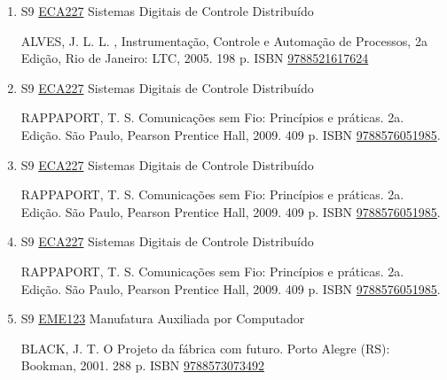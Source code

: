\documentclass[12pt,a4paper]{book}
\begin{document}
\begin{enumerate}
 BEKEY, George A.  Autonomous robots: from biological inspiration to implementation and control.  Massachusetts (EUA): Massachusetts Institute of Technology - MIT, 2005.  577 p.   ISBN \href{http://www.isbnsearch.org/isbn/9780262025782}{9780262025782}
 
 
 \item S9 \hyperref[PUD:ECA227]{ECA227} Sistemas Digitais de Controle Distribuído

  ALVES, J.  L.  L. , Instrumentação, Controle e Automação de Processos, 2a Edição, Rio de Janeiro: LTC, 2005.  198 p.  ISBN \href{http://www.bn.br/site/pages/servicosProfissionais/agenciaISBN/isbnBusca/FbnBuscaISBNCatalogo.asp?pField=ISBN&pIntPagina=1&pISBN=21617624&nidbISBN=true&hidbISBN=true}{9788521617624}
 
 
 \item S9 \hyperref[PUD:ECA227]{ECA227} Sistemas Digitais de Controle Distribuído

  RAPPAPORT, T.  S.  Comunicações sem Fio: Princípios e práticas.  2a.  Edição.  São Paulo, Pearson Prentice Hall, 2009.  409 p.  ISBN \href{http://www.bn.br/site/pages/servicosProfissionais/agenciaISBN/isbnBusca/FbnBuscaISBNCatalogo.asp?pField=ISBN&pIntPagina=1&pISBN=76051985&nidbISBN=true&hidbISBN=true}{9788576051985}.
 \item S9 \hyperref[PUD:ECA227]{ECA227} Sistemas Digitais de Controle Distribuído

  RAPPAPORT, T.  S.  Comunicações sem Fio: Princípios e práticas.  2a.  Edição.  São Paulo, Pearson Prentice Hall, 2009.  409 p.  ISBN \href{http://www.bn.br/site/pages/servicosProfissionais/agenciaISBN/isbnBusca/FbnBuscaISBNCatalogo.asp?pField=ISBN&pIntPagina=1&pISBN=76051985&nidbISBN=true&hidbISBN=true}{9788576051985}.
 \item S9 \hyperref[PUD:ECA227]{ECA227} Sistemas Digitais de Controle Distribuído

  RAPPAPORT, T.  S.  Comunicações sem Fio: Princípios e práticas.  2a.  Edição.  São Paulo, Pearson Prentice Hall, 2009.  409 p.  ISBN \href{http://www.bn.br/site/pages/servicosProfissionais/agenciaISBN/isbnBusca/FbnBuscaISBNCatalogo.asp?pField=ISBN&pIntPagina=1&pISBN=76051985&nidbISBN=true&hidbISBN=true}{9788576051985}.
 \item S9 \hyperref[PUD:EME123]{EME123} Manufatura Auxiliada por Computador

 BLACK, J.  T.  O Projeto da fábrica com futuro.  Porto Alegre (RS): Bookman, 2001.  288 p.  ISBN \href{http://www.bn.br/site/pages/servicosProfissionais/agenciaISBN/isbnBusca/FbnBuscaISBNCatalogo.asp?pField=ISBN&pIntPagina=1&pISBN=73073492&nidbISBN=true&hidbISBN=true}{9788573073492}


\end{enumerate}
\end{document}
